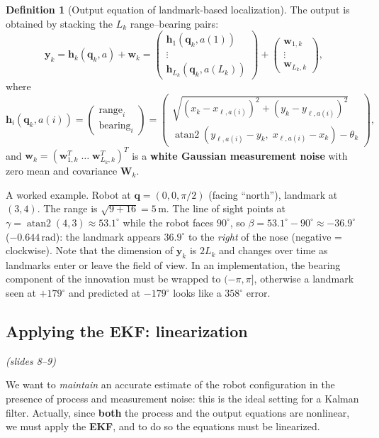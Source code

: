 \documentclass[11pt,a4paper]{article}
\theoremstyle{definition}
\newtheorem{definition}{Definition}[section]
\theoremstyle{plain}
\theoremstyle{remark}
\newcommand{\slides}[1]{\par\vspace{-2pt}\noindent\emph{(slides #1)}\par\smallskip}
\DeclareMathOperator{\atantwo}{atan2}
\begin{document}
\begin{definition}[Output equation of landmark-based localization]
\label{def:output}
The output is obtained by stacking the $L_k$ range--bearing pairs:
\[
\bm y_k=\bm h_k(\bm q_k,a)+\bm w_k=
\begin{pmatrix}\bm h_1(\bm q_k,a(1))\\ \vdots\\ \bm h_{L_k}(\bm q_k,a(L_k))\end{pmatrix}
+\begin{pmatrix}\bm w_{1,k}\\ \vdots\\ \bm w_{L_k,k}\end{pmatrix},
\]
where
\[
\bm h_i(\bm q_k,a(i))=
\begin{pmatrix}\text{range}_i\\ \text{bearing}_i\end{pmatrix}=
\begin{pmatrix}
\sqrt{(x_k-x_{\ell,a(i)})^2+(y_k-y_{\ell,a(i)})^2}\\[2pt]
\atantwo(y_{\ell,a(i)}-y_k,\;x_{\ell,a(i)}-x_k)-\theta_k
\end{pmatrix},
\]
and $\bm w_k=(\bm w_{1,k}^T\;\dots\;\bm w_{L_k,k}^T)^T$ is a \textbf{white Gaussian measurement noise} with zero mean and covariance $\bm W_k$.
\end{definition}

\begin{intuition}
A worked example. Robot at $\bm q=(0,0,\pi/2)$ (facing ``north''), landmark at $(3,4)$. The range is $\sqrt{9+16}=5$\,m. The line of sight points at $\gamma=\atantwo(4,3)\approx53.1^\circ$ while the robot faces $90^\circ$, so $\beta=53.1^\circ-90^\circ\approx-36.9^\circ$ ($-0.644$\,rad): the landmark appears $36.9^\circ$ to the \emph{right} of the nose (negative = clockwise). Note that the dimension of $\bm y_k$ is $2L_k$ and changes over time as landmarks enter or leave the field of view. In an implementation, the bearing component of the innovation must be wrapped to $(-\pi,\pi]$, otherwise a landmark seen at $+179^\circ$ and predicted at $-179^\circ$ looks like a $358^\circ$ error.
\end{intuition}

\subsection{Applying the EKF: linearization}
\slides{8--9}

We want to \emph{maintain} an accurate estimate of the robot configuration in the presence of process and measurement noise: this is the ideal setting for a Kalman filter. Actually, since \textbf{both} the process and the output equations are nonlinear, we must apply the \textbf{EKF}, and to do so the equations must be linearized.
\end{document}
